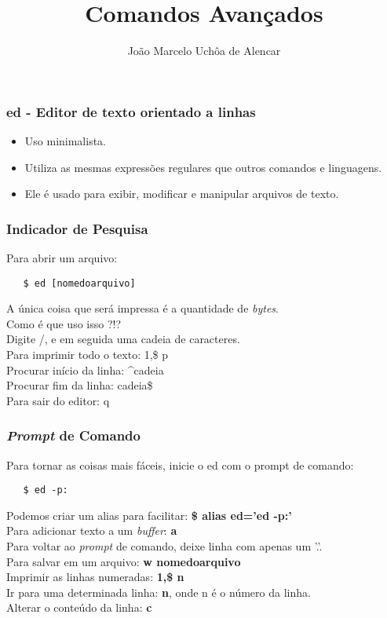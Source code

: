 \documentclass{beamer}
\title{Comandos Avançados}
\author[João Marcelo Uchôa de Alencar]{João Marcelo Uchôa de Alencar}
\institute{Universidade Federal do Ceará - Quixadá}
\begin{document}
   \begin{frame}
      \titlepage
   \end{frame}

   \begin{frame}
      \frametitle{ed - Editor de texto orientado a linhas}
      \begin{itemize}
         \item Uso minimalista. 
         \item Utiliza as mesmas expressões regulares que outros comandos e linguagens.
	 \item Ele é usado para exibir, modificar e manipular arquivos de texto. 
      \end{itemize}
   \end{frame}

\begin{frame}[fragile]
   \frametitle{Indicador de Pesquisa}
   Para abrir um arquivo: 
   \begin{verbatim}
   $ ed [nomedoarquivo] 
   \end{verbatim}
   A única coisa que será impressa é a quantidade de \textit{bytes}. \\
   Como é que uso isso ?!? \\
   Digite \slash, e em seguida uma cadeia de caracteres. \\
   Para imprimir todo o texto: 1,\$ p \\
   Procurar início da linha: \^{}cadeia \\
   Procurar fim da linha: cadeia\$ \\
   Para sair do editor: q \\
\end{frame}

\begin{frame}[fragile]
   \frametitle{\textit{Prompt} de Comando}
   Para tornar as coisas mais fáceis, inicie o ed com o prompt de comando: 
   \begin{verbatim}
   $ ed -p:
   \end{verbatim}
   Podemos criar um alias para facilitar: \textbf{\$ alias ed='ed -p:'} \\
   Para adicionar texto a um \textit{buffer}: \textbf{a} \\
   Para voltar ao \textit{prompt} de comando, deixe linha com apenas um '.'. \\
   Para salvar em um arquivo: \textbf{w nomedoarquivo} \\
   Imprimir as linhas numeradas: \textbf{1,\$ n} \\
   Ir para uma determinada linha: \textbf{n}, onde n é o número da linha. \\
   Alterar o conteúdo da linha: \textbf{c} \\
\end{frame}
\end{document}
